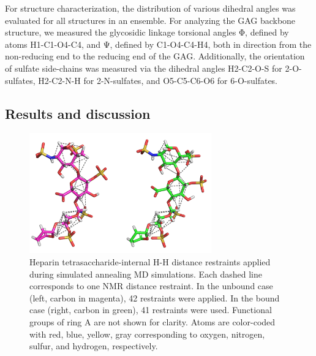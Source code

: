 For structure characterization, the distribution of various dihedral angles was
evaluated for all structures in an ensemble. For analyzing the GAG backbone
structure, we measured the glycosidic linkage torsional angles Φ, defined by
atoms H1-C1-O4-C4, and Ψ, defined by C1-O4-C4-H4, both in direction from the
non-reducing end to the reducing end of the GAG. Additionally, the orientation
of sulfate side-chains was measured via the dihedral angles H2-C2-O-S for
2-O-sulfates, H2-C2-N-H for 2-N-sulfates, and O5-C5-C6-O6 for 6-O-sulfates.

\subsection{Results and discussion}
\label{nmr:results_discussion}

\begin{figure}
\centering
\includegraphics[width=0.7\textwidth]{gfx/nmr/two_cases_dashed_lines_distances.png}
\caption[]{
Heparin tetrasaccharide-internal H-H distance restraints applied during
simulated annealing MD simulations. Each dashed line corresponds to one NMR
distance restraint. In the unbound case (left, carbon in magenta), 42
restraints were applied. In the bound case (right, carbon in green), 41
restraints were used. Functional groups of ring A are not shown for clarity.
Atoms are color-coded with red, blue, yellow, gray corresponding to oxygen,
nitrogen, sulfur, and hydrogen, respectively.
}
\label{fig:nmr:hp_dashed_lines_distances}
\end{figure}


